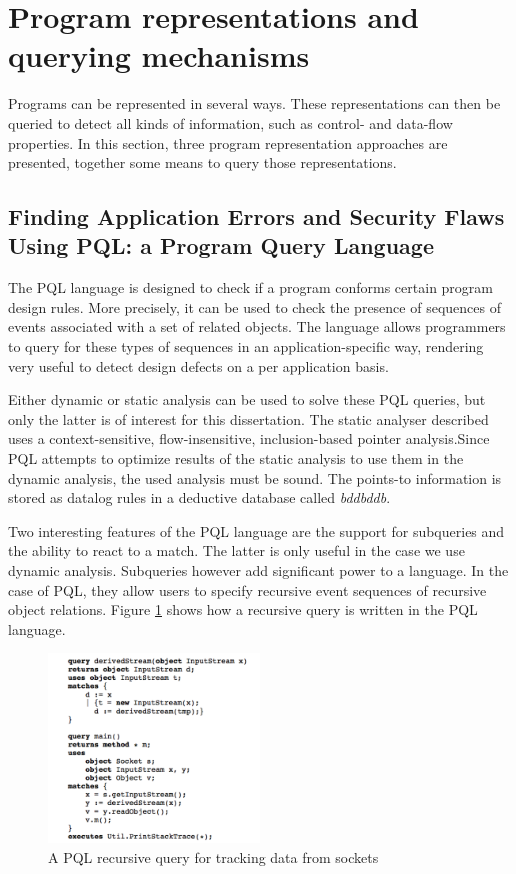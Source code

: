 \section{Program representations and querying mechanisms} %

Programs can be represented in several ways. These representations can then be queried to detect all kinds of information, such as control- and data-flow properties. In this section, three program representation approaches are presented, together some means to query those representations.

\subsection{Finding Application Errors and Security Flaws Using PQL: a Program Query Language}
The PQL language is designed to check if a program conforms certain program design rules\cite{PQL}. More precisely, it can be used to check the presence of sequences of events associated with a set of related objects. The language allows programmers to query for these types of sequences in an application-specific way, rendering very useful to detect design defects on a per application basis.

Either dynamic or static analysis can be used to solve these PQL queries, but only the latter is of interest for this dissertation. The static analyser described uses a context-sensitive, flow-insensitive, inclusion-based pointer analysis.Since PQL attempts to optimize results of the static analysis to use them in the dynamic analysis, the used analysis must be sound. The points-to information is stored as datalog rules in a deductive database called \textit{bddbddb}. 

Two interesting features of the PQL language are the support for subqueries and the ability to react to a match. The latter is only useful in the case we use dynamic analysis. Subqueries however add significant power to a language. In the case of PQL, they allow users to specify recursive event sequences of recursive object relations. Figure \ref{fig:derivedStream} shows how a recursive query is written in the PQL language.

\begin{figure}[!ht]
    \centering
      \includegraphics[width=0.5\textwidth]{images/derivedStream} 
      \caption{A PQL recursive query for tracking data from sockets}
    \label{fig:derivedStream}
\end{figure}

